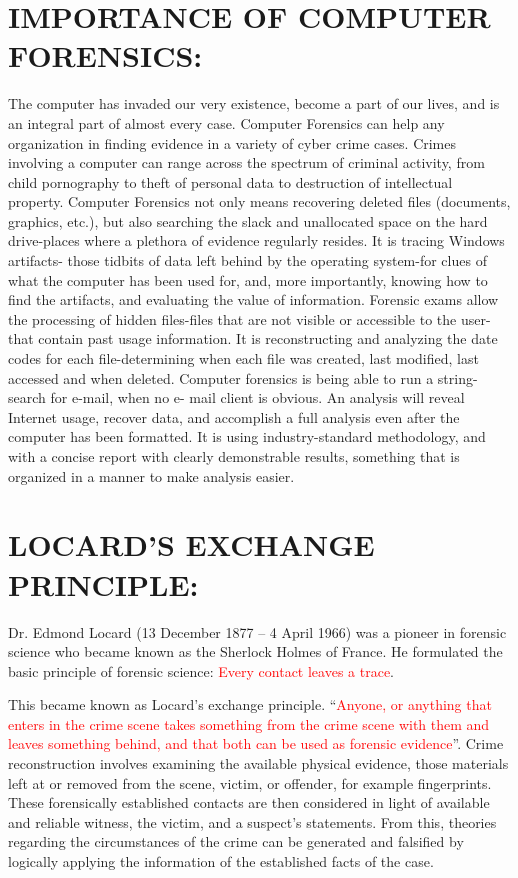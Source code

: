 \documentclass[10pt,british,english]{article}
\begin{document}
\section{IMPORTANCE OF COMPUTER FORENSICS:}

The computer has invaded our very existence, become a part of our
lives, and is an integral part of almost every case. Computer Forensics
can help any organization in finding evidence in a variety of cyber
crime cases. Crimes involving a computer can range across the spectrum
of criminal activity, from child pornography to theft of personal
data to destruction of intellectual property. Computer Forensics not
only means recovering deleted files (documents, graphics, etc.), but
also searching the slack and unallocated space on the hard drive-places
where a plethora of evidence regularly resides. It is tracing Windows
artifacts- those tidbits of data left behind by the operating system-for
clues of what the computer has been used for, and, more importantly,
knowing how to find the artifacts, and evaluating the value of information.
Forensic exams allow the processing of hidden files-files that are
not visible or accessible to the user-that contain past usage information.
It is reconstructing and analyzing the date codes for each file-determining
when each file was created, last modified, last accessed and when
deleted. Computer forensics is being able to run a string-search for
e-mail, when no e- mail client is obvious. An analysis will reveal
Internet usage, recover data, and accomplish a full analysis even
after the computer has been formatted. It is using industry-standard
methodology, and with a concise report with clearly demonstrable results,
something that is organized in a manner to make analysis easier.

\section{LOCARD\textquoteright S EXCHANGE PRINCIPLE:}

Dr. Edmond Locard (13 December 1877 -- 4 April 1966) was a pioneer
in forensic science who became known as the \textquotedbl Sherlock
Holmes of France\textquotedbl . He formulated the basic principle
of forensic science: \textquotedbl\textcolor{red}{Every contact
leaves a trace}\textquotedbl . 

This became known as Locard's exchange principle. \textquotedblleft \textcolor{red}{Anyone,
or anything that enters in the crime scene takes something from the
crime scene with them and leaves something behind, and that both can
be used as forensic evidence}\textquotedblright . Crime reconstruction
involves examining the available physical evidence, those materials
left at or removed from the scene, victim, or offender, for example
fingerprints. These forensically established contacts are then considered
in light of available and reliable witness, the victim, and a suspect's
statements. From this, theories regarding the circumstances of the
crime can be generated and falsified by logically applying the information
of the established facts of the case.
\end{document}
